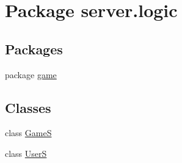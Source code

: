 \hypertarget{namespaceserver_1_1logic}{}\section{Package server.\+logic}
\label{namespaceserver_1_1logic}
\subsection*{Packages}
\begin{DoxyCompactItemize}
\item 
package \hyperlink{namespaceserver_1_1logic_1_1game}{game}
\end{DoxyCompactItemize}
\subsection*{Classes}
\begin{DoxyCompactItemize}
\item 
class \hyperlink{classserver_1_1logic_1_1_game_s}{GameS}
\item 
class \hyperlink{classserver_1_1logic_1_1_user_s}{UserS}
\end{DoxyCompactItemize}
